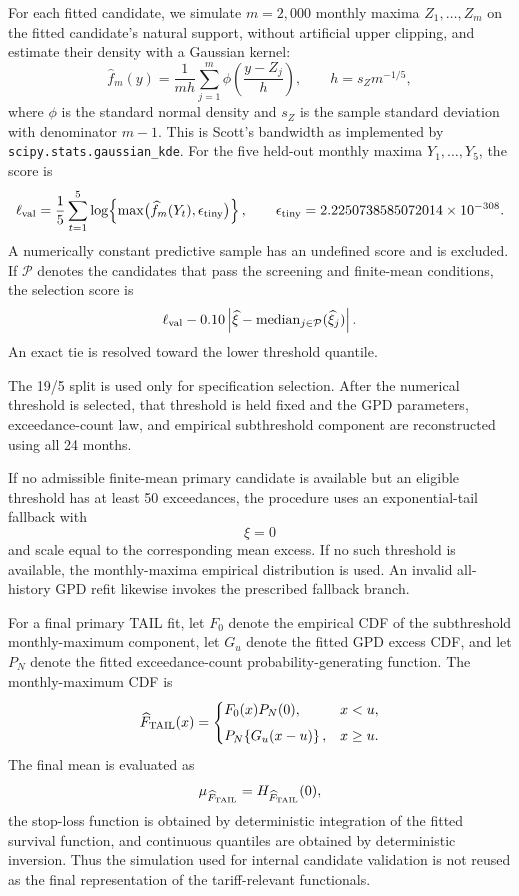 \documentclass[AMA,Times1COL]{WileyNJDv5}
\begin{document}
For each fitted candidate, we simulate \(m=2{,}000\) monthly maxima
\(Z_1,\ldots,Z_m\) on the fitted candidate's natural support, without
artificial upper clipping, and estimate their density with a Gaussian
kernel:
\[
\widehat f_m(y)=\frac{1}{mh}\sum_{j=1}^{m}
\phi\!\left(\frac{y-Z_j}{h}\right),
\qquad h=s_Zm^{-1/5},
\]
where \(\phi\) is the standard normal density and \(s_Z\) is the
sample standard deviation with denominator \(m-1\). This is Scott's
bandwidth as implemented by \texttt{scipy.stats.gaussian\_kde}.
For the five held-out monthly maxima \(Y_1,\ldots,Y_5\), the score is
\[
\ell_{\rm val}=\frac{1}{5}\sum_{t=1}^{5}
\log\!\left\{\max\bigl(\widehat f_m(Y_t),\epsilon_{\rm tiny}\bigr)\right\},
\qquad \epsilon_{\rm tiny}=2.2250738585072014\times10^{-308}.
\]
A numerically constant predictive sample has an undefined score and
is excluded. If \(\mathcal P\) denotes the candidates that pass the
screening and finite-mean conditions, the selection score is
\[
\ell_{\rm val}
-
0.10
\left|
\widehat\xi
-
\operatorname{median}_{j\in\mathcal P}
(\widehat\xi_j)
\right|.
\]
An exact tie is resolved toward the lower threshold quantile.

The 19/5 split is used only for specification selection. After the
numerical threshold is selected, that threshold is held fixed and the
GPD parameters, exceedance-count law, and empirical subthreshold
component are reconstructed using all 24 months.

If no admissible finite-mean primary candidate is available but an
eligible threshold has at least 50 exceedances, the procedure uses an
exponential-tail fallback with
\[
\xi=0
\]
and scale equal to the corresponding mean excess. If no such threshold
is available, the monthly-maxima empirical distribution is used.
An invalid all-history GPD refit likewise invokes the prescribed
fallback branch.

For a final primary TAIL fit, let \(F_0\) denote the empirical CDF of
the subthreshold monthly-maximum component, let \(G_u\) denote the
fitted GPD excess CDF, and let \(P_N\) denote the fitted exceedance-count
probability-generating function. The monthly-maximum CDF is
\[
\widehat F_{\rm TAIL}(x)
=
\begin{cases}
F_0(x)P_N(0),
&
x<u,
\\[4pt]
P_N\!\left\{G_u(x-u)\right\},
&
x\geq u.
\end{cases}
\]
The final mean is evaluated as
\[
\mu_{\widehat F_{\rm TAIL}}
=
H_{\widehat F_{\rm TAIL}}(0),
\]
the stop-loss function is obtained by deterministic integration of the
fitted survival function, and continuous quantiles are obtained by
deterministic inversion. Thus the simulation used for internal
candidate validation is not reused as the final representation of the
tariff-relevant functionals.
\end{document}
